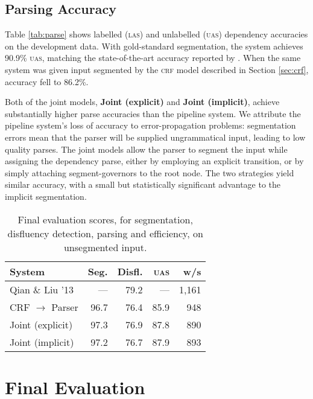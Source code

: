\documentclass[11pt,letterpaper]{article}
\begin{document}
\subsection{Parsing Accuracy}


Table \ref{tab:parse} shows labelled (\textsc{las}) and unlabelled
(\textsc{uas}) dependency accuracies on the development data.  With gold-standard
segmentation, the system achieves 90.9\%
\textsc{uas}, matching the state-of-the-art accuracy
reported by \citet{honnibal:14}.
When the same system was given input segmented by the \textsc{crf} model
described in Section \ref{sec:crf}, accuracy fell to 86.2\%.

Both of the joint models, \textbf{Joint (explicit)} and \textbf{Joint (implicit)},
achieve substantially higher parse accuracies than the pipeline system.
We attribute the pipeline system's loss of accuracy to error-propagation problems:
segmentation errors mean that the parser will be supplied ungrammatical input,
leading to low quality parses.
The joint models allow the parser to segment the input while assigning the
dependency parse, either by employing an explicit transition, or by simply
attaching segment-governors to the root node.  The two strategies yield similar
accuracy, with a small but statistically significant advantage to the implicit
segmentation.

\begin{table}
    \centering
    \small
    \begin{tabular}{l|rrrr}
        \hline
        System & Seg. & Disfl. & \textsc{uas} & w/s \\
        \hline \hline
        Qian \& Liu '13          & ---  & 79.2 & ---  & 1,161 \\
        CRF $\rightarrow$ Parser & 96.7 & 76.4 & 85.9 & 948   \\
        Joint (explicit)         & 97.3 & 76.9 & 87.8 & 890   \\
        Joint (implicit)         & 97.2 & 76.7 & 87.9 & 893   \\
        \hline
    \end{tabular}
    \caption{\small Final evaluation scores, for segmentation, disfluency detection,
    parsing and efficiency, on unsegmented input.\label{tab:test}}
    \vspace*{-4em}
\end{table}


\section{Final Evaluation}
\end{document}
